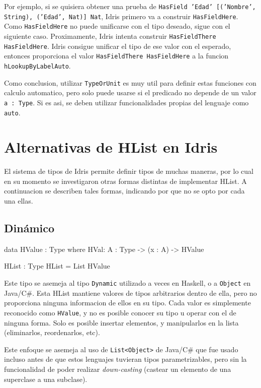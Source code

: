 Por ejemplo, si se quisiera obtener una prueba de \texttt{HasField 'Edad' [('Nombre', String), ('Edad', Nat)] Nat}, Idris primero va a construir \texttt{HasFieldHere}. Como \texttt{HasFieldHere} no puede unificarse con el tipo deseado, sigue con el siguiente caso. Proximamente, Idris intenta construir \texttt{HasFieldThere HasFieldHere}. Idris consigue unificar el tipo de ese valor con el esperado, entonces proporciona el valor \texttt{HasFieldThere HasFieldHere} a la funcion \texttt{hLookupByLabelAuto}.

Como conclusion, utilizar \texttt{TypeOrUnit} es muy util para definir estas funciones con calculo automatico, pero solo puede usarse si el predicado no depende de un valor \texttt{a : Type}. Si es asi, se deben utilizar funcionalidades propias del lenguaje como \texttt{auto}.

\section{Alternativas de HList en Idris}

El sistema de tipos de Idris permite definir tipos de muchas maneras, por lo cual en su momento se investigaron otras formas distintas de implementar HList.
A continuacion se describen tales formas, indicando por que no se opto por cada una ellas.

\subsection{Dinámico}

\begin{code}
data HValue : Type where
    HVal: {A : Type} -> (x : A) -> HValue

HList : Type
HList = List HValue 
\end{code}

Este tipo se asemeja al tipo \texttt{Dynamic} utilizado a veces en Haskell, o a \texttt{Object} en Java/C\#. Esta HList mantiene valores de tipos arbitrarios dentro de ella, pero no proporciona ninguna informacion de ellos en su tipo. Cada valor es simplemente reconocido como \texttt{HValue}, y no es posible conocer su tipo u operar con el de ninguna forma. Solo es posible insertar elementos, y manipularlos en la lista (eliminarlos, reordenarlos, etc).

Este enfoque se asemeja al uso de \texttt{List<Object>} de Java/C\# que fue usado incluso antes de que estos lenguajes tuvieran tipos parametrizables, pero sin la funcionalidad de poder realizar \textit{down-casting} (castear un elemento de una superclase a una subclase).

